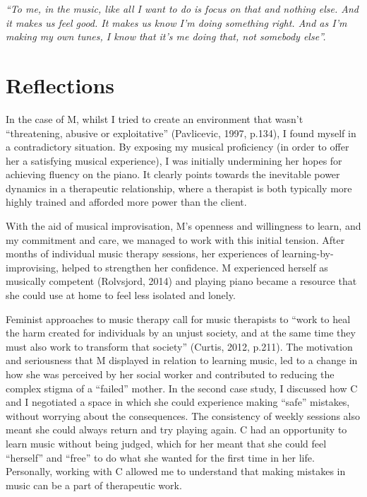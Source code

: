 \documentclass[authordate, empirical, issue]{jote-new-article}
\begin{document}
{\emph{“To me, in the music, like all I want to do is focus on that and nothing else. And it makes us feel good. It makes us know I'm doing something right. And as I'm making my own tunes, I know that it's me doing that, not somebody else”. }}











\section{Reflections}







In the case of M, whilst I tried to create an environment that wasn't “threatening, abusive or exploitative” (Pavlicevic, 1997, p.134), I found myself in a contradictory situation. By exposing my musical proficiency (in order to offer her a satisfying musical experience), I was initially undermining her hopes for achieving fluency on the piano. It clearly points towards the inevitable power dynamics in a therapeutic relationship, where a therapist is both typically more highly trained and afforded more power than the client.







With the aid of musical improvisation, M's openness and willingness to learn, and my commitment and care, we managed to work with this initial tension. After months of individual music therapy sessions, her experiences of learning-by-improvising, helped to strengthen her confidence. M experienced herself as musically competent (Rolvsjord, 2014) and playing piano became a resource that she could use at home to feel less isolated and lonely.







Feminist approaches to music therapy call for music therapists to “work to heal the harm created for individuals by an unjust society, and at the same time they must also work to transform that society” (Curtis, 2012, p.211). The motivation and seriousness that M displayed in relation to learning music, led to a change in how she was perceived by her social worker and contributed to reducing the complex stigma of a “failed” mother. In the second case study, I discussed how C and I negotiated a space in which she could experience making “safe” mistakes, without worrying about the consequences. The consistency of weekly sessions also meant she could always return and try playing again. C had an opportunity to learn music without being judged, which for her meant that she could feel “herself” and “free” to do what she wanted for the first time in her life. Personally, working with C allowed me to understand that making mistakes in music can be a part of therapeutic work.
\end{document}
